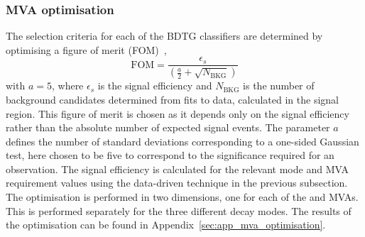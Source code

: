 \subsubsection{MVA optimisation}

The selection criteria for each of the BDTG classifiers are determined by optimising a figure of merit (FOM)~\cite{Punzi:2003bu}, 
\begin{equation}
\text{FOM}= \frac{\epsilon_{s}}{(\frac{a}{2} + \sqrt{N_{\text{BKG}}})}
\end{equation}
with $a=5$, where $\epsilon_{s}$ is the signal efficiency and $N_{\text{BKG}}$ is the number of background candidates determined from fits to data, calculated in the signal region. This figure of merit is chosen as it depends only on the signal efficiency rather than the absolute number of expected signal events. The parameter $a$ defines the number of standard deviations corresponding to a one-sided Gaussian test, here chosen to be five to correspond to the significance required for an observation.
The signal efficiency is calculated for the relevant mode and MVA requirement values using the data-driven technique in the previous subsection. 
The optimisation is performed in two dimensions, one for each of the \phiz and \Dsp MVAs. This is performed separately for the three different \Dsp decay modes. The results of the optimisation can be found in Appendix~\ref{sec:app_mva_optimisation}. 

